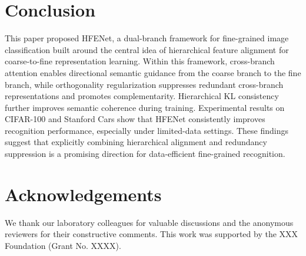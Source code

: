 \documentclass[pdflatex,sn-mathphys-num]{sn-jnl}
\theoremstyle{thmstyleone}%
\theoremstyle{thmstyletwo}%
\theoremstyle{thmstylethree}%
\begin{document}
\section{Conclusion}
\label{sec:conclusion}
This paper proposed HFENet, a dual-branch framework for fine-grained image classification built around the central idea of hierarchical feature alignment for coarse-to-fine representation learning. 
Within this framework, cross-branch attention enables directional semantic guidance from the coarse branch to the fine branch, while orthogonality regularization suppresses redundant cross-branch representations and promotes complementarity. 
Hierarchical KL consistency further improves semantic coherence during training. 
Experimental results on CIFAR-100 and Stanford Cars show that HFENet consistently improves recognition performance, especially under limited-data settings. 
These findings suggest that explicitly combining hierarchical alignment and redundancy suppression is a promising direction for data-efficient fine-grained recognition.

\section*{Acknowledgements}
We thank our laboratory colleagues for valuable discussions and the anonymous reviewers for their constructive comments. This work was supported by the XXX Foundation (Grant No. XXXX).
\end{document}
